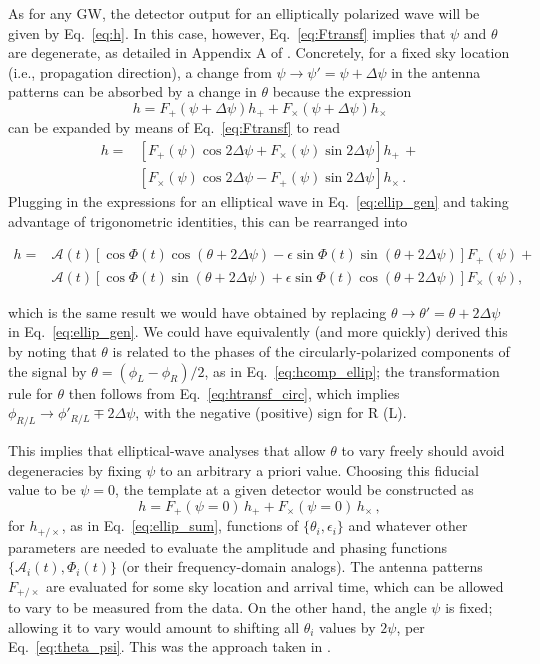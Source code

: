 \documentclass[aps,prd,twocolumn,superscriptaddress,preprintnumbers,floatfix,nofootinbib]{revtex4-2}
\newcommand{\beq}{\begin{equation}}
\newcommand{\eeq}{\end{equation}}
\newcommand*{\eq}[1]{Eq.~\eqref{eq:#1}}
\begin{document}
As for any GW, the detector output for an elliptically polarized wave will be given by \eq{h}.
In this case, however, \eq{Ftransf} implies that $\psi$ and $\theta$ are degenerate, as detailed in Appendix A of \cite{Isi:2017equ}.
Concretely, for a fixed sky location (i.e., propagation direction), a change from $\psi \to \psi' = \psi + \Delta\psi$ in the antenna patterns can be absorbed by a change in $\theta$ because the expression
\beq
h = F_+(\psi + \Delta \psi) h_+ + F_\times(\psi + \Delta \psi) h_\times 
\eeq
can be expanded by means of \eq{Ftransf} to read
\begin{align}
h = &\left[ F_+(\psi) \cos 2\Delta\psi + F_\times(\psi) \sin 2\Delta\psi \right] h_+\, + \\
 &\left[F_\times(\psi) \cos 2\Delta\psi - F_+(\psi)\sin 2\Delta\psi\right] h_\times \, .
\end{align}
Plugging in the expressions for an elliptical wave in \eq{ellip_gen} and taking advantage of trigonometric identities, this can be rearranged into
\begin{widetext}
\begin{align} \label{eq:theta_psi}
h = & \mathcal{A}(t) \left[\cos \Phi(t) \cos(\theta + 2\Delta\psi) -  \epsilon \sin \Phi(t)\sin(\theta + 2\Delta\psi) \right] F_+(\psi) +\nonumber\\
&\mathcal{A}(t) \left[\cos \Phi(t) \sin(\theta + 2\Delta\psi) + \epsilon \sin \Phi(t) \cos(\theta + 2\Delta\psi) \right] F_\times(\psi), 
\end{align}
\end{widetext}
which is the same result we would have obtained by replacing $\theta \to \theta' = \theta + 2 \Delta\psi$ in \eq{ellip_gen}.
We could have equivalently (and more quickly) derived this by noting that $\theta$ is related to the phases of the circularly-polarized components of the signal by $\theta = \left(\phi_L - \phi_R\right)/2$, as in \eq{hcomp_ellip}; the transformation rule for $\theta$ then follows from \eq{htransf_circ}, which implies $\phi_{R/L} \to \phi'_{R/L} \mp 2\Delta\psi$, with the negative (positive) sign for R (L).

This implies that elliptical-wave analyses that allow $\theta$ to vary freely should avoid degeneracies by fixing $\psi$ to an arbitrary a priori value.
Choosing this fiducial value to be $\psi=0$, the template at a given detector would be constructed as
\begin{equation}
h = F_+(\psi=0)\, h_+ + F_\times(\psi=0)\,  h_\times \, ,
\end{equation}
for $h_{+/\times}$, as in Eq.~\eqref{eq:ellip_sum}, functions of $\{\theta_i, \epsilon_i\}$ and whatever other parameters are needed to evaluate the amplitude and phasing functions $\{\mathcal{A}_i(t), \Phi_i(t)\}$ (or their frequency-domain analogs).
The antenna patterns $F_{+/\times}$ are evaluated for some sky location and arrival time, which can be allowed to vary to be measured from the data.
On the other hand, the angle $\psi$ is fixed; allowing it to vary would amount to shifting all $\theta_i$ values by $2\psi$, per Eq.~\eqref{eq:theta_psi}.
This was the approach taken in \cite{Isi:2017equ,Chatziioannou:2021mij,Isi:2021iql}.
\end{document}
